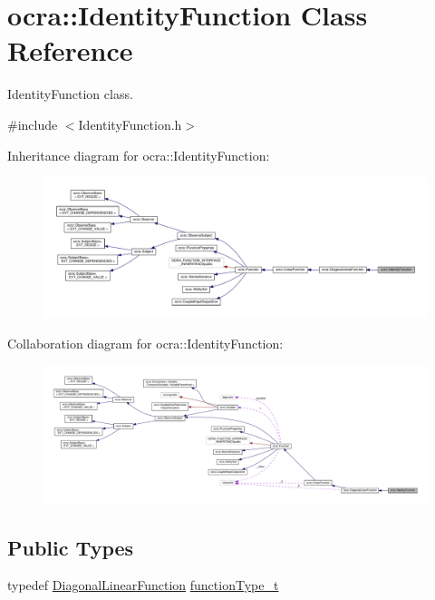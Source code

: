 \hypertarget{classocra_1_1IdentityFunction}{}\section{ocra\+:\+:Identity\+Function Class Reference}
\label{classocra_1_1IdentityFunction}


Identity\+Function class.  




{\ttfamily \#include $<$Identity\+Function.\+h$>$}



Inheritance diagram for ocra\+:\+:Identity\+Function\+:
\nopagebreak
\begin{figure}[H]
\begin{center}
\leavevmode
\includegraphics[width=350pt]{db/d8b/classocra_1_1IdentityFunction__inherit__graph}
\end{center}
\end{figure}


Collaboration diagram for ocra\+:\+:Identity\+Function\+:
\nopagebreak
\begin{figure}[H]
\begin{center}
\leavevmode
\includegraphics[width=350pt]{d7/d34/classocra_1_1IdentityFunction__coll__graph}
\end{center}
\end{figure}
\subsection*{Public Types}
\begin{DoxyCompactItemize}
\item 
typedef \hyperlink{classocra_1_1DiagonalLinearFunction}{Diagonal\+Linear\+Function} \hyperlink{classocra_1_1IdentityFunction_a4598384746d901d0a13b712666288894}{function\+Type\+\_\+t}
\end{DoxyCompactItemize}
